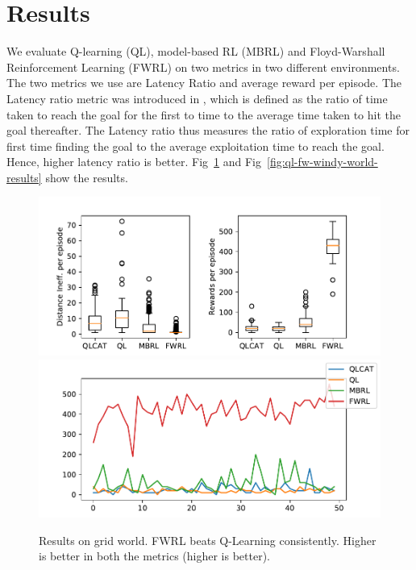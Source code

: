 \section{Results}

We evaluate Q-learning (QL), model-based RL (MBRL) and Floyd-Warshall
Reinforcement Learning (FWRL) on two metrics in two different environments. The
two metrics we use are Latency Ratio and average reward per episode. The Latency
ratio metric was introduced in \citet{MiPaViICLR2017}, which is defined as the
ratio of time taken to reach the goal for the first to time to the average time
taken to hit the goal thereafter. The Latency ratio thus measures the ratio of
exploration time for first time finding the goal to the average exploitation
time to reach the goal. Hence, higher latency ratio is better.
Fig~\ref{fig:ql-fw-grid-world-results} and
Fig~\ref{fig:ql-fw-windy-world-results} show the results.

\begin{figure}%
\includegraphics[width=\columnwidth]{./media/metrics-grid-world.pdf}\\
\includegraphics[width=\columnwidth]{./media/rewards-metrics-grid-world.pdf}\\
\caption{Results on grid world. FWRL beats Q-Learning consistently. Higher is
  better in both the metrics (higher is better).}
\label{fig:ql-fw-grid-world-results}%
\end{figure}


